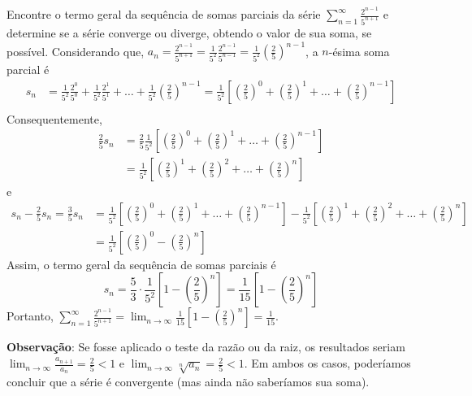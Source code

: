 \documentclass[12pt,a4paper]{article}
\begin{document}
\begin{ExerciseList}
\Exercise[title={2,0}] Encontre o termo geral da sequência de somas parciais da série $\displaystyle \sum_{n = 1}^{\infty} \frac{2^{n-1}}{5^{n + 1}}$ e determine se a série converge ou diverge, obtendo o valor de sua soma, se possível.
\Answer Considerando que, $a_n = \frac{2^{n-1}}{5^{n + 1}} = \frac{1}{5^{2}}\frac{2^{n-1}}{5^{n-1}} = \frac{1}{5^{2}}\left(\frac{2}{5}\right)^{n-1}$, a $n$-ésima soma parcial é
\begin{align*}
    s_n
    & = \frac{1}{5^{2}} \frac{2^{0}}{5^{0}} + \frac{1}{5^{2}} \frac{2^{1}}{5^{1}} + \ldots + \frac{1}{5^{2}}\left(\frac{2}{5}\right)^{n-1}
      = \frac{1}{5^{2}} \left[ \left(\frac{2}{5}\right)^{0} + \left(\frac{2}{5}\right)^{1} + \ldots + \left(\frac{2}{5}\right)^{n-1}\right] \\
\end{align*}
Consequentemente,
\begin{align*}
    \frac{2}{5} s_n
    & = \frac{2}{5} \frac{1}{5^{2}} \left[ \left(\frac{2}{5}\right)^{0} + \left(\frac{2}{5}\right)^{1} + \ldots + \left(\frac{2}{5}\right)^{n-1}\right] \\
    & = \frac{1}{5^{2}} \left[ \left(\frac{2}{5}\right)^{1} + \left(\frac{2}{5}\right)^{2} + \ldots + \left(\frac{2}{5}\right)^{n}\right]
\end{align*}
e
\begin{align*}
    s_n - \frac{2}{5} s_n
      = \frac{3}{5} s_n
    & = \frac{1}{5^{2}} \left[ \left(\frac{2}{5}\right)^{0} + \left(\frac{2}{5}\right)^{1} + \ldots + \left(\frac{2}{5}\right)^{n-1}\right]
      - \frac{1}{5^{2}} \left[ \left(\frac{2}{5}\right)^{1} + \left(\frac{2}{5}\right)^{2} + \ldots + \left(\frac{2}{5}\right)^{n}\right] \\
    & =  \frac{1}{5^{2}} \left[\left(\frac{2}{5}\right)^{0} - \left(\frac{2}{5}\right)^{n}\right]
\end{align*}
Assim, o termo geral da sequência de somas parciais é
\[
s_n = \frac{5}{3} \cdot \frac{1}{5^{2}} \left[1 - \left(\frac{2}{5}\right)^{n}\right]
    = \frac{1}{15} \left[1 - \left(\frac{2}{5}\right)^{n}\right]
\]
Portanto, $\displaystyle \sum_{n = 1}^{\infty} \frac{2^{n-1}}{5^{n + 1}} = \lim_{n \to \infty} \frac{1}{15} \left[1 - \left(\frac{2}{5}\right)^{n}\right] = \frac{1}{15}$.

\textbf{Observação}: Se fosse aplicado o teste da razão ou da raiz, os resultados seriam $\lim_{n \to \infty} \frac{a_{n+1}}{a_n} = \frac{2}{5} < 1$ e $\lim_{n \to \infty} \sqrt[n]{a_n} = \frac{2}{5} < 1$. Em ambos os casos, poderíamos concluir que a série é convergente (mas ainda não saberíamos sua soma).


\end{ExerciseList}
\end{document}
